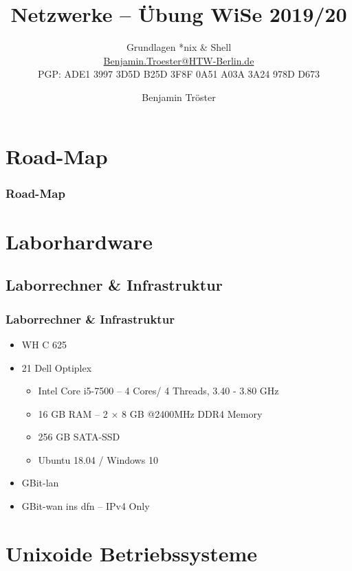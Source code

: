 \documentclass[xcolor=dvipsnames,aspectratio=169]{beamer}
\begin{document}

\title{Netzwerke -- Übung WiSe 2019/20}
\subtitle{Grundlagen *nix \& Shell\\
\href{mailto:Benjamin.Troester@HTW-Berlin.de}{Benjamin.Troester@HTW-Berlin.de}\\
		PGP: ADE1 3997 3D5D B25D 3F8F 0A51 A03A 3A24 978D D673 }

\author{Benjamin Tröster}

\date{}

\begin{frame}
\titlepage
\end{frame}

\section*{Road-Map}
\begin{frame}
\frametitle{Road-Map}
\begin{multicols}{2}
  \tableofcontents
\end{multicols}
\end{frame}

\section{Laborhardware}
\subsection{Laborrechner \& Infrastruktur}
\begin{frame}
	\frametitle{Laborrechner \& Infrastruktur}
\begin{itemize}
	\item WH C 625
	\item 21 Dell Optiplex
	\begin{itemize}
		\item Intel Core i5-7500 -- 4 Cores/ 4 Threads, 3.40 - 3.80 GHz
		\item 16 GB RAM -- 2 $\times$ 8 GB @2400MHz DDR4 Memory
		\item 256 GB SATA-SSD
		\item Ubuntu 18.04 / Windows 10
	\end{itemize}
	\item GBit-\ac{lan}
	\item GBit-\ac{wan} ins \ac{dfn} -- IPv4 Only
\end{itemize}
\end{frame}

\section{Unixoide Betriebssysteme}
\end{document}
